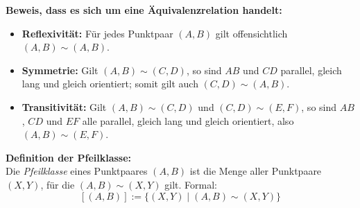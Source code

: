 \documentclass[12pt,a4paper]{article}
\begin{document}
\noindent \textbf{Beweis, dass es sich um eine Äquivalenzrelation handelt:}
\begin{itemize}
    \item \textbf{Reflexivität:} Für jedes Punktpaar $(A, B)$ gilt offensichtlich $(A, B) \sim (A, B)$.
    \item \textbf{Symmetrie:} Gilt $(A, B) \sim (C, D)$, so sind $AB$ und $CD$ parallel, gleich lang und gleich orientiert; somit gilt auch $(C, D) \sim (A, B)$.
    \item \textbf{Transitivität:} Gilt $(A, B) \sim (C, D)$ und $(C, D) \sim (E, F)$, so sind $AB$, $CD$ und $EF$ alle parallel, gleich lang und gleich orientiert, also $(A, B) \sim (E, F)$.
\end{itemize}

\noindent \textbf{Definition der Pfeilklasse:}\\
\noindent Die \emph{Pfeilklasse} eines Punktpaares $(A, B)$ ist die Menge aller Punktpaare $(X, Y)$, für die $(A, B) \sim (X, Y)$ gilt. Formal:
\[
[(A, B)] := \{ (X, Y) \mid (A, B) \sim (X, Y) \}
\]
\end{document}
